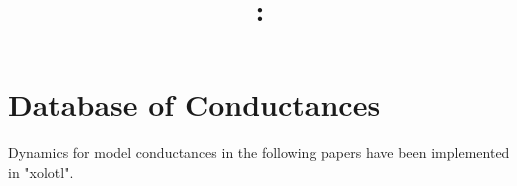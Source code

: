 \documentclass[utf8]{frontiers_suppmat} %
\begin{document}
\onecolumn
{}

\title[Supplementary Material]{{}:
\\ } %


\maketitle


\section{Database of Conductances}

Dynamics for model conductances in the following papers have been implemented in "xolotl".
\end{document}
